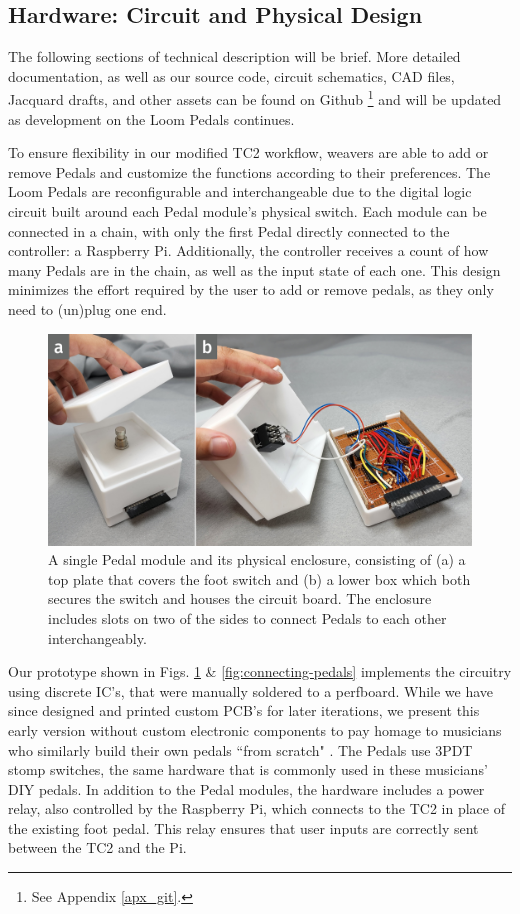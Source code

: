 \subsection{Hardware: Circuit and Physical Design}

The following sections of technical description will be brief. More detailed documentation, as well as our source code, circuit schematics, CAD files, Jacquard drafts, and other assets can be found on Github \footnote{See Appendix \ref{apx_git}.} and will be updated as development on the Loom Pedals continues.

To ensure flexibility in our modified TC2 workflow, weavers are able to add or remove Pedals and customize the functions according to their preferences. The Loom Pedals are reconfigurable and interchangeable due to the digital logic circuit built around each Pedal module's physical switch. Each module can be connected in a chain, with only the first Pedal directly connected to the controller: a Raspberry Pi. Additionally, the controller receives a count of how many Pedals are in the chain, as well as the input state of each one. This design minimizes the effort required by the user to add or remove pedals, as they only need to (un)plug one end.

\begin{figure}
    \centering
    \includegraphics[width=\linewidth]{figs/LP_6_pedal-enclosure.jpg}
    \caption[Photographs of a single Pedal module.]{A single Pedal module and its physical enclosure, consisting of (a) a top plate that covers the foot switch and (b) a lower box which both secures the switch and houses the circuit board. The enclosure includes slots on two of the sides to connect Pedals to each other interchangeably.}
    \label{fig:pedal-module}
\end{figure}

Our prototype shown in Figs. \ref{fig:pedal-module} \& \ref{fig:connecting-pedals} implements the circuitry using discrete IC’s, that were manually soldered to a perfboard. While we have since designed and printed custom PCB's for later iterations, we present this early version without custom electronic components to pay homage to musicians who similarly build their own pedals ``from scratch" \cite{collins_handmade_2020}. The Pedals use 3PDT stomp switches, the same hardware that is commonly used in these musicians' DIY pedals. In addition to the Pedal modules, the hardware includes a power relay, also controlled by the Raspberry Pi, which connects to the TC2 in place of the existing foot pedal. This relay ensures that user inputs are correctly sent between the TC2 and the Pi.

